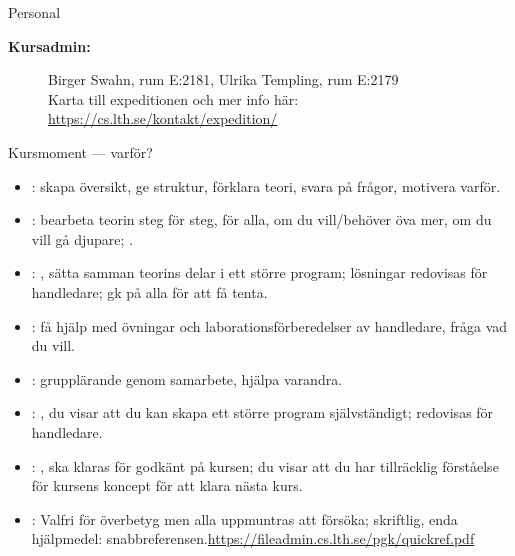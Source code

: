 \begin{SlideExtra}{Personal \CurrentYear}
\begin{description}
\item [\bfseries Kursadmin:]
Birger Swahn, rum E:2181, Ulrika Templing, rum E:2179 \\
Karta till expeditionen och mer info här: 
\url{https://cs.lth.se/kontakt/expedition/} \\
\end{description}
\end{SlideExtra}
\fi


\begin{Slide}{Kursmoment --- varför?}\SlideFontTiny
\begin{itemize}

\item {}: skapa översikt, ge struktur, förklara teori, svara på frågor, motivera varför.

\item {}: bearbeta teorin steg för steg,  för alla,  om du vill/behöver öva mer,  om du vill gå djupare; .

\item {}: , sätta samman teorins delar i ett större program; lösningar redovisas för handledare; gk på alla för att få tenta.

\item {}: få hjälp med övningar och laborationsförberedelser av handledare, fråga vad du vill.

\item {}: grupplärande genom samarbete, hjälpa varandra.

\item {}: , du visar att du kan skapa ett större program självständigt; redovisas för handledare.
\item {}: , ska klaras för godkänt på kursen; du visar att du har tillräcklig förståelse för kursens koncept för att klara nästa kurs. 

\item {}: Valfri för överbetyg men alla uppmuntras att försöka; skriftlig, enda hjälpmedel: snabbreferensen.\url{https://fileadmin.cs.lth.se/pgk/quickref.pdf}
\end{itemize}
\end{Slide}

